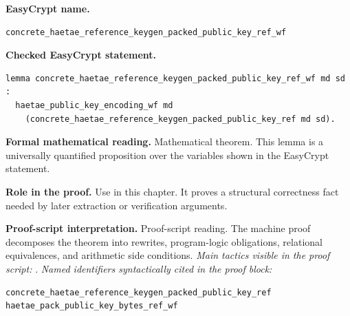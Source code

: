 \begin{formaltheorem}
\noindent\textbf{EasyCrypt name.}
\begin{lstlisting}[language=EasyCrypt,basicstyle=\ttfamily\scriptsize]
concrete_haetae_reference_keygen_packed_public_key_ref_wf
\end{lstlisting}
\noindent\textbf{Checked EasyCrypt statement.}
\begin{lstlisting}[language=EasyCrypt,basicstyle=\ttfamily\scriptsize]
lemma concrete_haetae_reference_keygen_packed_public_key_ref_wf md sd :
  haetae_public_key_encoding_wf md
    (concrete_haetae_reference_keygen_packed_public_key_ref md sd).
\end{lstlisting}
\noindent\textbf{Formal mathematical reading.}
Mathematical theorem. This lemma is a universally quantified proposition over the variables shown in the EasyCrypt statement.

\noindent\textbf{Role in the proof.}
Use in this chapter. It proves a structural correctness fact needed by later extraction or verification arguments.

\noindent\textbf{Proof-script interpretation.}
Proof-script reading. The machine proof decomposes the theorem into rewrites, program-logic obligations, relational equivalences, and arithmetic side conditions.
\emph{Main tactics visible in the proof script:} .
\emph{Named identifiers syntactically cited in the proof block:}
\begin{lstlisting}[language=EasyCrypt,basicstyle=\ttfamily\scriptsize]
concrete_haetae_reference_keygen_packed_public_key_ref
haetae_pack_public_key_bytes_ref_wf
\end{lstlisting}

\end{formaltheorem}

